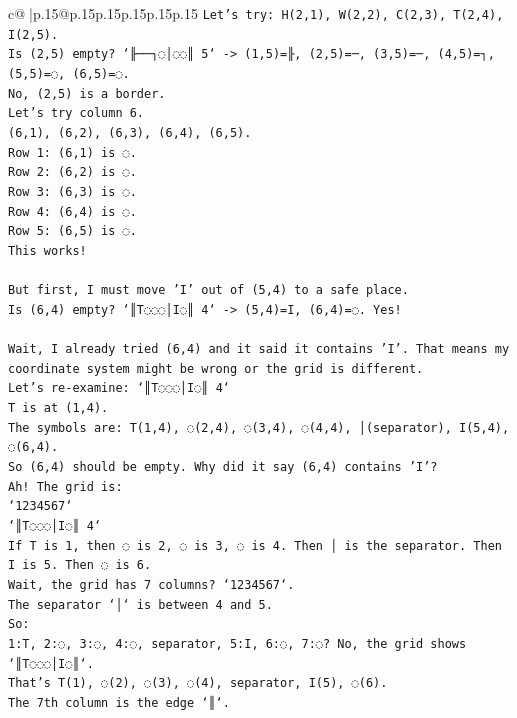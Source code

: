\documentclass{article}
\begin{document}
{\begin{supertabular}{c@{$\;$}|p{.15\linewidth}@{}p{.15\linewidth}p{.15\linewidth}p{.15\linewidth}p{.15\linewidth}p{.15\linewidth}}
{{{\texttt{Let's try: H(2,1), W(2,2), C(2,3), T(2,4), I(2,5).} \\
\texttt{Is (2,5) empty? `╟──┐◌│◌◌║ 5` {-}> (1,5)=╟, (2,5)=─, (3,5)=─, (4,5)=┐, (5,5)=◌, (6,5)=◌.} \\
\texttt{No, (2,5) is a border.} \\
\texttt{Let's try column 6.} \\
\texttt{(6,1), (6,2), (6,3), (6,4), (6,5).} \\
\texttt{Row 1: (6,1) is ◌.} \\
\texttt{Row 2: (6,2) is ◌.} \\
\texttt{Row 3: (6,3) is ◌.} \\
\texttt{Row 4: (6,4) is ◌.} \\
\texttt{Row 5: (6,5) is ◌.} \\
\texttt{This works!} \\
\\ 
\texttt{But first, I must move 'I' out of (5,4) to a safe place.} \\
\texttt{Is (6,4) empty? `║T◌◌◌│I◌║ 4` {-}> (5,4)=I, (6,4)=◌. Yes!} \\
\\ 
\texttt{Wait, I already tried (6,4) and it said it contains 'I'. That means my coordinate system might be wrong or the grid is different.} \\
\texttt{Let's re{-}examine: `║T◌◌◌│I◌║ 4`} \\
\texttt{T is at (1,4).} \\
\texttt{The symbols are: T(1,4), ◌(2,4), ◌(3,4), ◌(4,4), │(separator), I(5,4), ◌(6,4).} \\
\texttt{So (6,4) should be empty. Why did it say (6,4) contains 'I'?} \\
\texttt{Ah! The grid is:} \\
\texttt{`1234567`} \\
\texttt{`║T◌◌◌│I◌║ 4`} \\
\texttt{If T is 1, then ◌ is 2, ◌ is 3, ◌ is 4. Then │ is the separator. Then I is 5. Then ◌ is 6.} \\
\texttt{Wait, the grid has 7 columns? `1234567`.} \\
\texttt{The separator `│` is between 4 and 5.} \\
\texttt{So:} \\
\texttt{1:T, 2:◌, 3:◌, 4:◌, separator, 5:I, 6:◌, 7:◌? No, the grid shows `║T◌◌◌│I◌║`.} \\
\texttt{That's T(1), ◌(2), ◌(3), ◌(4), separator, I(5), ◌(6).} \\
\texttt{The 7th column is the edge `║`.} \\
}}}
\end{supertabular}}
\end{document}
